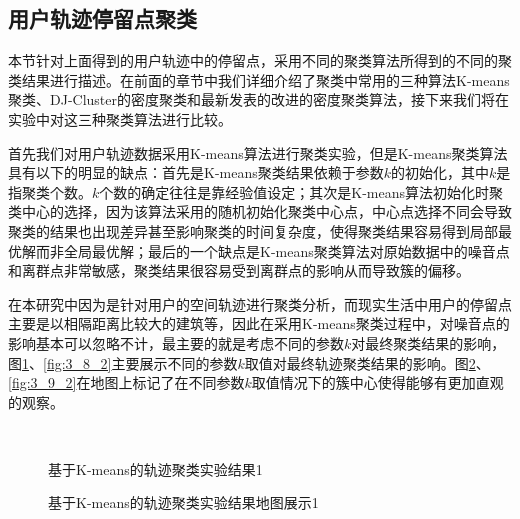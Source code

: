 \subsection{用户轨迹停留点聚类}
本节针对上面得到的用户轨迹中的停留点，采用不同的聚类算法所得到的不同的聚类结果进行描述。在前面的章节中我们详细介绍了聚类中常用的三种算法K-means聚类、DJ-Cluster的密度聚类和最新发表的改进的密度聚类算法，接下来我们将在实验中对这三种聚类算法进行比较。
\par 首先我们对用户轨迹数据采用K-means算法进行聚类实验，但是K-means聚类算法具有以下的明显的缺点：首先是K-means聚类结果依赖于参数$k$的初始化，其中$k$是指聚类个数。$k$个数的确定往往是靠经验值设定；其次是K-means算法初始化时聚类中心的选择，因为该算法采用的随机初始化聚类中心点，中心点选择不同会导致聚类的结果也出现差异甚至影响聚类的时间复杂度，使得聚类结果容易得到局部最优解而非全局最优解；最后的一个缺点是K-means聚类算法对原始数据中的噪音点和离群点非常敏感，聚类结果很容易受到离群点的影响从而导致簇的偏移。
\par 在本研究中因为是针对用户的空间轨迹进行聚类分析，而现实生活中用户的停留点主要是以相隔距离比较大的建筑等，因此在采用K-means聚类过程中，对噪音点的影响基本可以忽略不计，最主要的就是考虑不同的参数$k$对最终聚类结果的影响，图\ref{fig:3_8_1}、\ref{fig:3_8_2}主要展示不同的参数$k$取值对最终轨迹聚类结果的影响。图\ref{fig:3_9_1}、\ref{fig:3_9_2}在地图上标记了在不同参数$k$取值情况下的簇中心使得能够有更加直观的观察。
\begin{figure}[htb]
  \centering%
  \\
  \caption{基于K-means的轨迹聚类实验结果1}
  \label{fig:3_8_1}
\end{figure}
\begin{figure}[htb]
  \centering%
  \caption{基于K-means的轨迹聚类实验结果地图展示1}
  \label{fig:3_9_1}
\end{figure}
